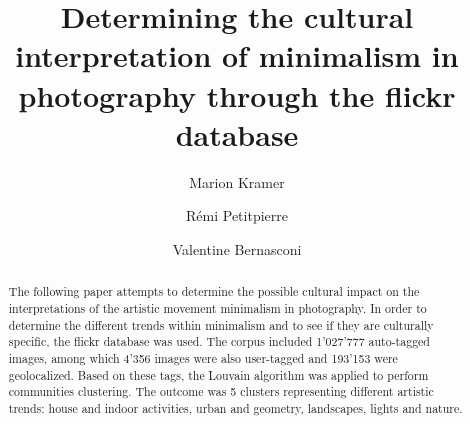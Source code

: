 \documentclass[sigconf]{acmart}
\begin{document}
\makeatletter
\renewcommand\subsection{\@startsection{subsection}{3}{\z@}%
                                     {-3.25ex\@plus -1ex \@minus -.2ex}%
                                     {-1.5ex \@plus -.2ex}%
                                     {\normalfont\normalsize\bfseries}}
\makeatother

\title{Determining the cultural interpretation of minimalism in photography through the flickr database}

\author{Marion Kramer}

\author{Rémi Petitpierre}

\author{Valentine Bernasconi}


\renewcommand{\shortauthors}{Petitpierre, et al.}

\begin{abstract}
  The following paper attempts to determine the possible cultural impact on the interpretations of the artistic movement minimalism in photography. In order to determine the different trends within minimalism and to see if they are culturally specific, the flickr database was used. The corpus included 1'027'777 auto-tagged images, among which 4'356  images were also user-tagged and 193'153 were geolocalized. Based on these tags, the Louvain algorithm was applied to perform communities clustering. The outcome was 5 clusters representing different artistic trends: house and indoor activities, urban and geometry, landscapes, lights and nature.
\end{abstract}
\end{document}
